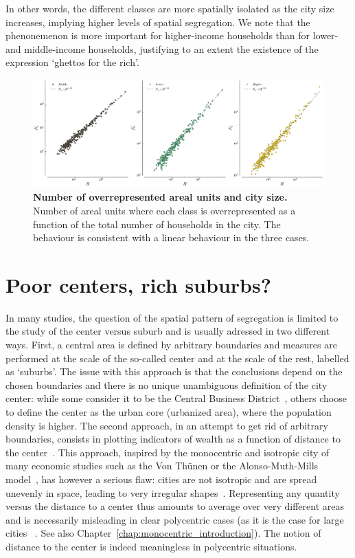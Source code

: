 In other words, the different classes are more spatially isolated as the city
size increases, implying higher levels of spatial segregation. We note that the
phenonemenon is more important for higher-income households than for lower- and
middle-income households, justifying to an extent the existence of the
expression `ghettos for the rich'.\\

\begin{figure}
    \centering
    \includegraphics[width=\textwidth]{./gfx/chapter-segregation/number_overrepresented.pdf}
    \caption{{\bf Number of overrepresented areal units and city size.} Number of areal units where each class is overrepresented as a
    function of the total number of households in the city. The behaviour is
consistent with a linear behaviour in the three cases.
\label{fig:overrepresented}}
\end{figure}


\section{Poor centers, rich suburbs?}
\label{sec:poor_centers_rich_suburbs_}

In many studies, the question of the spatial pattern of segregation is limited
to the study of the center versus suburb and is usually adressed in two
different ways. First, a central area is defined by arbitrary boundaries and
measures are performed at the scale of the so-called center and at the scale of
the  rest, labelled as `suburbs'. The issue with this approach is that the
conclusions depend on the chosen boundaries and there is no unique unambiguous
definition of the city center: while some consider it to be the Central Business
District~\cite{Glaeser:2008}, others choose to define the center as the urban
core (urbanized area), where the population density is higher. The second
approach, in an attempt to get rid of arbitrary boundaries, consists in plotting
indicators of wealth as a function of distance to the
center~\cite{Glaeser:2008}. This approach, inspired by the monocentric and
isotropic city of many economic studies such as the Von Th\"unen or the
Alonso-Muth-Mills model~\cite{Brueckner:1987}, has however a serious flaw:
cities are not isotropic and are spread unevenly in space, leading to very
irregular shapes~\cite{Makse:1995}. Representing any quantity versus the
distance to a center thus amounts to average over very different areas and is necessarily misleading in
clear polycentric cases (as it is the case for large cities
~\cite{Louf:2013_polycentric}. See also
Chapter~\ref{chap:monocentric_introduction}). The notion of distance to the center is indeed
meaningless in polycentric situations.\\



